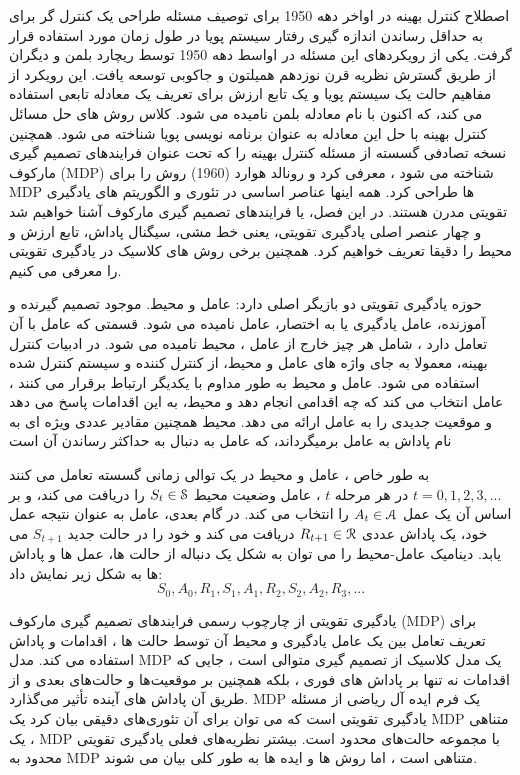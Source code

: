 

اصطلاح کنترل بهینه در اواخر دهه 1950 برای توصیف مسئله طراحی یک کنترل گر برای به حداقل رساندن اندازه گیری رفتار سیستم پویا در طول زمان مورد استفاده قرار گرفت. یکی از رویکردهای این مسئله در اواسط دهه 1950 توسط ریچارد بلمن و دیگران از طریق گسترش نظریه قرن نوزدهم همیلتون و جاکوبی توسعه یافت. این رویکرد از مفاهیم حالت یک سیستم پویا و یک تابع ارزش برای تعریف یک معادله تابعی استفاده می کند، که اکنون با نام معادله بلمن نامیده می شود. کلاس روش های حل مسائل کنترل بهینه با حل این معادله به عنوان برنامه نویسی پویا شناخته می شود. همچنین نسخه تصادفی گسسته از مسئله کنترل بهینه را که تحت عنوان فرایندهای تصمیم گیری مارکوف (MDP) شناخته می شود ، معرفی کرد و رونالد هوارد (1960) روش
  را برای MDP ها طراحی کرد. همه اینها عناصر اساسی در تئوری و الگوریتم های یادگیری تقویتی مدرن هستند.
  در این فصل، یا فرایندهای تصمیم گیری مارکوف آشنا خواهیم شد و چهار عنصر اصلی یادگیری تقویتی، یعنی خط مشی، سیگنال پاداش، تابع ارزش و محیط را دقیقا تعریف خواهیم کرد. همچنین برخی روش های کلاسیک در یادگیری تقویتی را معرفی می کنیم.

حوزه یادگیری تقویتی  دو بازیگر اصلی دارد: عامل و محیط. موجود تصمیم گیرنده و آموزنده، عامل یادگیری یا به اختصار، عامل نامیده می شود. قسمتی که عامل با آن تعامل دارد ، شامل
هر چیز خارج از عامل ، محیط نامیده می شود.  در ادبیات کنترل بهینه، معمولا به  جای واژه های عامل و محیط، از کنترل کننده و سیستم کنترل شده استفاده می شود.
 عامل و محیط به طور مداوم با یکدیگر ارتباط برقرار می کنند ، عامل انتخاب می کند که چه اقدامی انجام دهد و محیط، به این اقدامات پاسخ می دهد و موقعیت جدیدی را به عامل ارائه می دهد.
محیط همچنین مقادیر عددی ویژه ای به نام پاداش  به عامل برمیگرداند، که عامل به دنبال به حداکثر رساندن آن است

به طور خاص ، عامل و محیط در یک توالی زمانی گسسته تعامل می کنند 
$t = 0,1,2,3,...$
در هر مرحله $t$ ، عامل وضعیت محیط  
$S_t \in \EuScript{S}$
را دریافت می کند، و بر اساس آن یک عمل 
$A_t \in \EuScript{A}$
را انتخاب می کند. در گام بعدی، عامل به عنوان نتیجه عمل خود، یک پاداش عددی $R_{t+1} \in \EuScript{R}$ دریافت می کند و خود را در حالت جدید $S_{t+1}$ می یابد.
دینامیک عامل-محیط را می توان به شکل یک دنباله از حالت ها، عمل ها و پاداش ها به شکل زیر نمایش داد:
$$S_0, A_0, R_1, S_1, A_1, R_2, S_2, A_2, R_3, ...$$


یادگیری تقویتی از چارچوب رسمی فرایندهای تصمیم گیری مارکوف (MDP) برای تعریف تعامل بین یک عامل یادگیری و محیط آن توسط حالت ها ، اقدامات و پاداش استفاده می کند. مدل MDP یک مدل کلاسیک از تصمیم گیری متوالی است ، جایی که اقدامات نه تنها بر پاداش های فوری ، بلکه همچنین بر موقعیت‌ها و حالت‌های بعدی و از طریق آن پاداش های آینده تأثیر می‌گذارد.
MDP یک فرم ایده آل ریاضی از مسئله یادگیری تقویتی است که می توان برای آن تئوری‌های دقیقی بیان کرد
یک MDP متناهی ، یک MDP با مجموعه حالت‌های محدود است. بیشتر نظریه‌های فعلی یادگیری تقویتی محدود به MDP متناهی است ، اما روش ها و ایده ها به طور کلی بیان می شوند.


